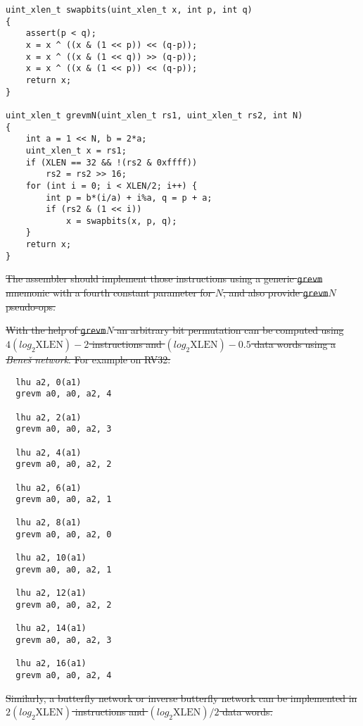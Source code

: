 \begin{verbatim}
uint_xlen_t swapbits(uint_xlen_t x, int p, int q)
{
    assert(p < q);
    x = x ^ ((x & (1 << p)) << (q-p));
    x = x ^ ((x & (1 << q)) >> (q-p));
    x = x ^ ((x & (1 << p)) << (q-p));
    return x;
}

uint_xlen_t grevmN(uint_xlen_t rs1, uint_xlen_t rs2, int N)
{
    int a = 1 << N, b = 2*a;
    uint_xlen_t x = rs1;
    if (XLEN == 32 && !(rs2 & 0xffff))
        rs2 = rs2 >> 16;
    for (int i = 0; i < XLEN/2; i++) {
        int p = b*(i/a) + i%a, q = p + a;
        if (rs2 & (1 << i))
            x = swapbits(x, p, q);
    }
    return x;
}
\end{verbatim}

\sout{
The assembler should implement those instructions using a generic \texttt{grevm}
mnemonic with a fourth constant parameter for $N$, and also provide
\texttt{grevm}$N$ pseudo-ops.
}

\sout{
With the help of \texttt{grevm}$N$ an arbitrary bit permutation can be computed
using $4(log_2\textrm{XLEN})-2$ instructions and $(log_2\textrm{XLEN})-0.5$ data words using a
{\it Bene\v{s} network}. For example on RV32:
}

\begin{verbatim}
  lhu a2, 0(a1)
  grevm a0, a0, a2, 4

  lhu a2, 2(a1)
  grevm a0, a0, a2, 3

  lhu a2, 4(a1)
  grevm a0, a0, a2, 2

  lhu a2, 6(a1)
  grevm a0, a0, a2, 1

  lhu a2, 8(a1)
  grevm a0, a0, a2, 0

  lhu a2, 10(a1)
  grevm a0, a0, a2, 1

  lhu a2, 12(a1)
  grevm a0, a0, a2, 2

  lhu a2, 14(a1)
  grevm a0, a0, a2, 3

  lhu a2, 16(a1)
  grevm a0, a0, a2, 4
\end{verbatim}

\sout{
Similarly, a butterfly network or inverse butterfly network can be implemented
in $2(log_2\textrm{XLEN})$ instructions and $(log_2\textrm{XLEN})/2$ data words.
}


\section{}

